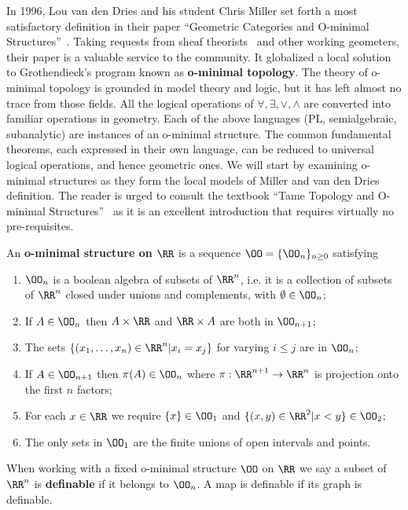 In 1996, Lou van den Dries and his student Chris Miller set forth a most satisfactory definition in their paper ``Geometric Categories and O-minimal Structures''~\cite{vdd-geocat}. Taking requests from sheaf theorists~\cite{schmid-cc} and other working geometers, their paper is a valuable service to the community. It globalized a local solution to Grothendieck's program known as \textbf{o-minimal topology}. The theory of o-minimal topology is grounded in model theory and logic, but it has left almost no trace from those fields. All the logical operations of $\forall,\exists,\lor,\land$ are converted into familiar operations in geometry. Each of the above languages (PL, semialgebraic, subanalytic) are instances of an o-minimal structure. The common fundamental theorems, each expressed in their own language, can be reduced to universal logical operations, and hence geometric ones. We will start by examining o-minimal structures as they form the local models of Miller and van den Dries definition. The reader is urged to consult the textbook ``Tame Topology and O-minimal Structures''~\cite{vdd-ttos} as it is an excellent introduction that requires virtually no pre-requisites.

\begin{defn}
 An \textbf{o-minimal structure on $\RR$} is a sequence $\OO=\{\OO_n\}_{n\geq 0}$ satisfying
 \begin{enumerate}
  \item $\OO_n$ is a boolean algebra of subsets of $\RR^n$, i.e. it is a collection of subsets of $\RR^n$ closed under unions and complements, with $\emptyset \in\OO_n$;
  \item If $A\in\OO_n$ then $A\times\RR$ and $\RR\times A$ are both in $\OO_{n+1}$;
  \item The sets $\{(x_1,\ldots,x_n)\in\RR^n|x_i=x_j\}$ for varying $i\leq j$ are in $\OO_n$;
  \item If $A\in\OO_{n+1}$ then $\pi(A)\in\OO_{n}$ where $\pi:\RR^{n+1}\to\RR^n$ is projection onto the first $n$ factors;
  \item For each $x\in\RR$ we require $\{x\}\in\OO_1$ and $\{(x,y)\in\RR^2|x<y\}\in\OO_2$;
  \item The only sets in $\OO_1$ are the finite unions of open intervals and points.
 \end{enumerate}
When working with a fixed o-minimal structure $\OO$ on $\RR$ we say a subset of $\RR^n$ is \textbf{definable} if it belongs to $\OO_n$. A map is definable if its graph is definable.
\end{defn}

